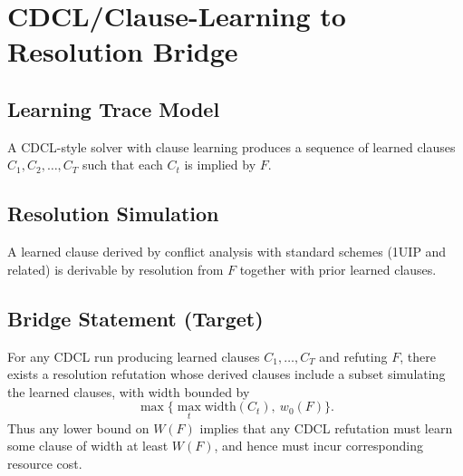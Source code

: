\section{CDCL/Clause-Learning to Resolution Bridge}

\subsection{Learning Trace Model}
A CDCL-style solver with clause learning produces a sequence of learned clauses
$C_1,C_2,\dots,C_T$ such that each $C_t$ is implied by $F$.

\subsection{Resolution Simulation}
A learned clause derived by conflict analysis with standard schemes
(1UIP and related) is derivable by resolution from $F$ together with prior learned clauses.

\subsection{Bridge Statement (Target)}
For any CDCL run producing learned clauses $C_1,\dots,C_T$ and refuting $F$,
there exists a resolution refutation whose derived clauses include
a subset simulating the learned clauses, with width bounded by
\[
\max\{ \max_t \mathrm{width}(C_t),\ w_0(F)\}.
\]
Thus any lower bound on $W(F)$ implies that any CDCL refutation must learn
some clause of width at least $W(F)$, and hence must incur corresponding resource cost.
